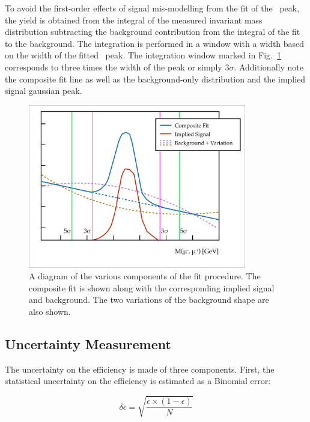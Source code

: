 To avoid the first-order effects of signal mis-modelling from the fit of the \jpsi\ peak, the yield is obtained from the integral of the measured invariant mass distribution subtracting the background contribution from the integral of the fit to the background. The integration is performed in a window with a width based on the width of the fitted \jpsi\ peak. The integration window marked in Fig.~\ref{fig:CalibrationFittingExample} corresponds to three times the width of the peak or simply $3\sigma$. Additionally note the composite fit line as well as the background-only distribution and the implied signal gaussian peak.

\begin{figure}[htbp]
  \centering
  \includegraphics[width=0.85\textwidth]{PartCalibration2012/Plots/FittingExample.pdf}
  \caption{A diagram of the various components of the fit procedure. The composite fit is shown along with the corresponding implied signal and background. The two variations of the background shape are also shown.} \label{fig:CalibrationFittingExample}
\end{figure}

\subsection{Uncertainty Measurement} \label{sec:CalibrationUncertainty}

The uncertainty on the efficiency is made of three components. First, the statistical uncertainty on the efficiency is estimated as a Binomial error:

\begin{equation}
  \delta\epsilon = \sqrt{\frac{\epsilon\times(1-\epsilon)}{N}}
\end{equation}


